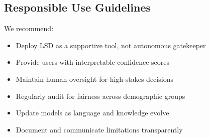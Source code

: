 \documentclass[11pt]{article}
\begin{document}
\subsection{Responsible Use Guidelines}

We recommend:
\begin{itemize}[leftmargin=*]
    \item Deploy LSD as a supportive tool, not autonomous gatekeeper
    \item Provide users with interpretable confidence scores
    \item Maintain human oversight for high-stakes decisions
    \item Regularly audit for fairness across demographic groups
    \item Update models as language and knowledge evolve
    \item Document and communicate limitations transparently
\end{itemize}
\end{document}
